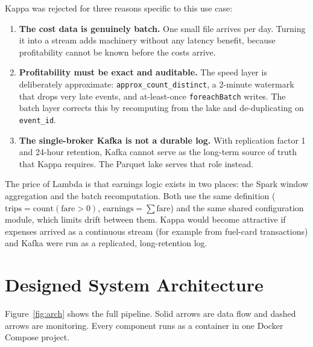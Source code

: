 \documentclass[11pt,a4paper]{article}
\newcommand{\code}[1]{\texttt{\small #1}}
\begin{document}
Kappa was rejected for three reasons specific to this use case:
\begin{enumerate}
  \item \textbf{The cost data is genuinely batch.} One small file arrives per day. Turning it into a
    stream adds machinery without any latency benefit, because profitability cannot be known before
    the costs arrive.
  \item \textbf{Profitability must be exact and auditable.} The speed layer is deliberately
    approximate: \code{approx\_count\_distinct}, a 2-minute watermark that drops very late events,
    and at-least-once \code{foreachBatch} writes. The batch layer corrects this by recomputing from
    the lake and de-duplicating on \code{event\_id}.
  \item \textbf{The single-broker Kafka is not a durable log.} With replication factor 1 and
    24-hour retention, Kafka cannot serve as the long-term source of truth that Kappa requires.
    The Parquet lake serves that role instead.
\end{enumerate}

The price of Lambda is that earnings logic exists in two places: the Spark window aggregation and
the batch recomputation. Both use the same definition ($\text{trips}=\text{count}(\text{fare}>0)$,
$\text{earnings}=\sum\text{fare}$) and the same shared configuration module, which limits drift
between them. Kappa would become attractive if expenses arrived as a continuous stream (for
example from fuel-card transactions) and Kafka were run as a replicated, long-retention log.

\section{Designed System Architecture}

Figure~\ref{fig:arch} shows the full pipeline. Solid arrows are data flow and dashed arrows are
monitoring. Every component runs as a container in one Docker Compose project.
\end{document}
